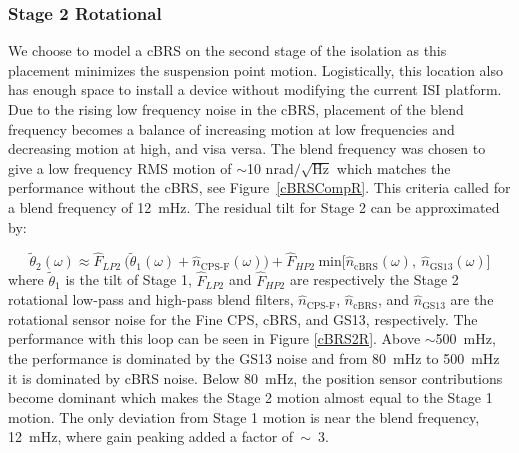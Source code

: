 \documentclass [12pt, proquest]{uwthesis}[2019]
\begin{document}
\subsubsection{Stage 2 Rotational}


We choose to model a cBRS on the second stage of the isolation as this placement minimizes the suspension point motion. Logistically, this location also has enough space to install a device without modifying the current ISI platform. Due to the rising low frequency noise in the cBRS, placement of the blend frequency becomes a balance of increasing motion at low frequencies and decreasing motion at high, and visa versa. The blend frequency was chosen to give a low frequency RMS motion of $\sim$10 nrad$/\sqrt{\text{Hz}}$ which matches the performance without the cBRS, see Figure~\ref{cBRSCompR}. This criteria called for a blend frequency of 12~mHz. The residual tilt for Stage 2 can be approximated by:

\begin{equation}
\tilde{\theta}_2(\omega)\approx \hat{F}_{LP2}\ \big(\tilde{\theta}_1(\omega)+\hat{n}_\text{CPS-F}(\omega)\big)+\hat{F}_{HP2}\ \text{min}\big[\hat{n}_\text{cBRS}(\omega),\ \hat{n}_\text{GS13}(\omega)\big]
\end{equation}
where $\tilde{\theta}_1$ is the tilt of Stage 1, $\hat{F}_{LP2}$ and $\hat{F}_{HP2}$ are respectively the Stage 2 rotational low-pass and high-pass blend filters, $\hat{n}_\text{CPS-F}$, $\hat{n}_\text{cBRS}$, and $\hat{n}_\text{GS13}$ are the rotational sensor noise for the Fine CPS, cBRS, and GS13, respectively. The performance with this loop can be seen in Figure \ref{cBRS2R}. Above $\sim$500~mHz, the performance is dominated by the GS13 noise and from 80~mHz to 500~mHz it is dominated by cBRS noise. Below 80~mHz, the position sensor contributions become dominant which makes the Stage 2 motion almost equal to the Stage 1 motion. The only deviation from Stage 1 motion is near the blend frequency, 12~mHz, where gain peaking added a factor of~$\sim$~3. 
\end{document}
